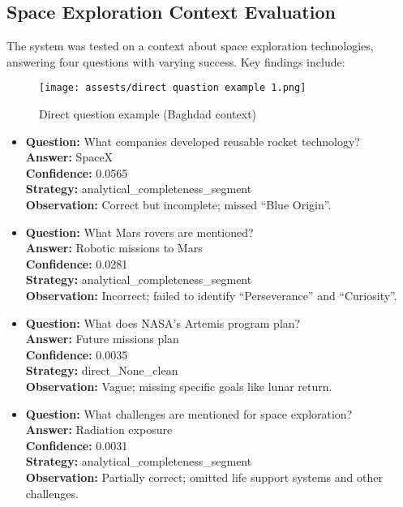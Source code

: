 \documentclass[conference]{IEEEtran}
\begin{document}
\subsection{Space Exploration Context Evaluation}

The system was tested on a context about space exploration technologies, answering four questions with varying success. Key findings include:
\begin{figure}[H]
  \centering
  \texttt{[image: assests/direct quastion example 1.png]}
  \caption{Direct question example (Baghdad context)}
  \label{fig:Direct question example (Baghdad context)}
  \end{figure}
\begin{itemize}
    \item \textbf{Question:} What companies developed reusable rocket technology?\\
    \textbf{Answer:} SpaceX\\
    \textbf{Confidence:} 0.0565\\
    \textbf{Strategy:} analytical\_completeness\_segment\\
    \textbf{Observation:} Correct but incomplete; missed ``Blue Origin''.

    \item \textbf{Question:} What Mars rovers are mentioned?\\
    \textbf{Answer:} Robotic missions to Mars\\
    \textbf{Confidence:} 0.0281\\
    \textbf{Strategy:} analytical\_completeness\_segment\\
    \textbf{Observation:} Incorrect; failed to identify ``Perseverance'' and ``Curiosity''.

    \item \textbf{Question:} What does NASA's Artemis program plan?\\
    \textbf{Answer:} Future missions plan\\
    \textbf{Confidence:} 0.0035\\
    \textbf{Strategy:} direct\_None\_clean\\
    \textbf{Observation:} Vague; missing specific goals like lunar return.

    \item \textbf{Question:} What challenges are mentioned for space exploration?\\
    \textbf{Answer:} Radiation exposure\\
    \textbf{Confidence:} 0.0031\\
    \textbf{Strategy:} analytical\_completeness\_segment\\
    \textbf{Observation:} Partially correct; omitted life support systems and other challenges.
    
\end{itemize}
\end{document}
